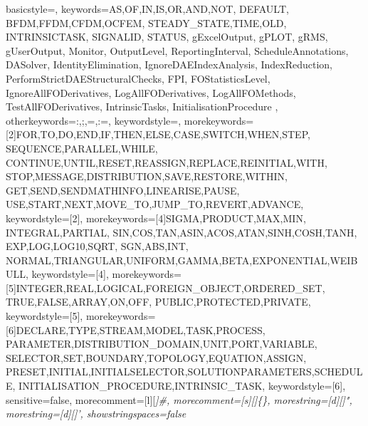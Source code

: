 {
basicstyle=\ttfamily,
%
keywords={AS,OF,IN,IS,OR,AND,NOT,
          DEFAULT,
          BFDM,FFDM,CFDM,OCFEM,
          STEADY_STATE,TIME,OLD,
          INTRINSICTASK,
          SIGNALID, STATUS, %
  gExcelOutput,
  gPLOT,
  gRMS,
  gUserOutput,
  Monitor,
  OutputLevel,
  ReportingInterval,
  ScheduleAnnotations,
  DASolver,
  IdentityElimination,
  IgnoreDAEIndexAnalysis,
  IndexReduction,
  PerformStrictDAEStructuralChecks,
  FPI,
  FOStatisticsLevel,
  IgnoreAllFODerivatives,
  LogAllFODerivatives,
  LogAllFOMethods,
  TestAllFODerivatives,
  IntrinsicTasks,
  InitialisationProcedure
},
otherkeywords={:,;,=,:=},
keywordstyle=\color{MB_conn},
morekeywords={[2]FOR,TO,DO,END,IF,THEN,ELSE,CASE,SWITCH,WHEN,STEP,
                 SEQUENCE,PARALLEL,WHILE,
                 CONTINUE,UNTIL,RESET,REASSIGN,REPLACE,REINITIAL,WITH,
                 STOP,MESSAGE,DISTRIBUTION,SAVE,RESTORE,WITHIN,
                 GET,SEND,SENDMATHINFO,LINEARISE,PAUSE,
                 USE,START,NEXT,MOVE_TO,JUMP_TO,REVERT,ADVANCE},
keywordstyle={[2]\color{MB_lang}},
morekeywords={[4]SIGMA,PRODUCT,MAX,MIN,
                 INTEGRAL,PARTIAL,
                 SIN,COS,TAN,ASIN,ACOS,ATAN,SINH,COSH,TANH,
                 EXP,LOG,LOG10,SQRT,
                 SGN,ABS,INT,
                 NORMAL,TRIANGULAR,UNIFORM,GAMMA,BETA,EXPONENTIAL,WEIBULL},
keywordstyle={[4]\color{MB_func}},
morekeywords={[5]INTEGER,REAL,LOGICAL,FOREIGN_OBJECT,ORDERED_SET,
                 TRUE,FALSE,ARRAY,ON,OFF,
                 PUBLIC,PROTECTED,PRIVATE},
keywordstyle={[5]\color{MB_attr}},
morekeywords={[6]DECLARE,TYPE,STREAM,MODEL,TASK,PROCESS,
                 PARAMETER,DISTRIBUTION_DOMAIN,UNIT,PORT,VARIABLE,
                 SELECTOR,SET,BOUNDARY,TOPOLOGY,EQUATION,ASSIGN,
                 PRESET,INITIAL,INITIALSELECTOR,SOLUTIONPARAMETERS,SCHEDULE,
                 INITIALISATION_PROCEDURE,INTRINSIC_TASK},
keywordstyle={[6]\color{MB_sect}},
sensitive=false,
morecomment=[l][\color{MB_comm}\itshape]{\#},
morecomment=[s][\color{MB_comm}\itshape]{\{}{\}},
morestring=[d][\color{MB_str}]",
morestring=[d][\color{MB_str}]',
showstringspaces=false
}
